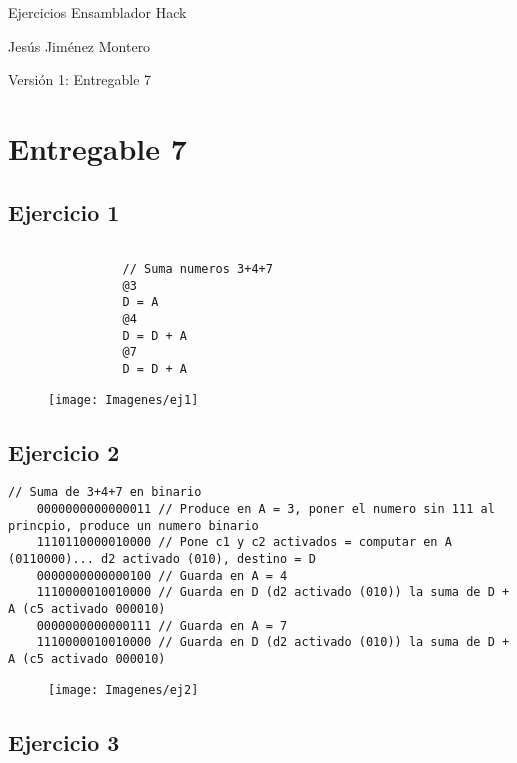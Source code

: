 \documentclass[12pt]{article}
\begin{document}
	\begin{titlepage}
		\begin{center}
			{\Large Ejercicios Ensamblador Hack}

			\vspace{3cm}

			{\large Jesús Jiménez Montero}

			\vspace{2cm}

			Versión 1: Entregable 7
		\end{center}
	\end{titlepage}

	\newpage
	\renewcommand{\contentsname}{Tabla de contenidos}
	\setcounter{secnumdepth}{5}
	\tableofcontents
	\setcounter{tocdepth}{4}
	\newpage

	\section{Entregable 7}
		\subsection{Ejercicio 1}
			\begin{lstlisting}

				// Suma numeros 3+4+7
				@3
				D = A
				@4
				D = D + A
				@7
				D = D + A
			\end{lstlisting}

			\begin{figure}[H]
				\centering
				\texttt{[image: Imagenes/ej1]}
				\label{fig:ej1}
			\end{figure}

		\newpage
		\subsection{Ejercicio 2}
			\begin{lstlisting}[]
	// Suma de 3+4+7 en binario
	0000000000000011 // Produce en A = 3, poner el numero sin 111 al princpio, produce un numero binario
	1110110000010000 // Pone c1 y c2 activados = computar en A (0110000)... d2 activado (010), destino = D
	0000000000000100 // Guarda en A = 4
	1110000010010000 // Guarda en D (d2 activado (010)) la suma de D + A (c5 activado 000010)
	0000000000000111 // Guarda en A = 7
	1110000010010000 // Guarda en D (d2 activado (010)) la suma de D + A (c5 activado 000010)
			\end{lstlisting}

			\begin{figure}[H]
				\centering
				\texttt{[image: Imagenes/ej2]}
				\label{fig:ej2}
			\end{figure}
		\newpage
		\subsection{Ejercicio 3}
			\begin{lstlisting}

			\end{lstlisting}
\end{document}
